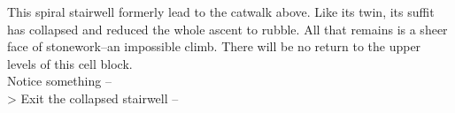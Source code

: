 This spiral stairwell formerly lead to the catwalk above. Like its twin, its suffit has collapsed and reduced the whole ascent to rubble. All that remains is a sheer face of stonework--an impossible climb. There will be no return to the upper levels of this cell block.\\

 Notice something -- \\
> Exit the collapsed stairwell -- 